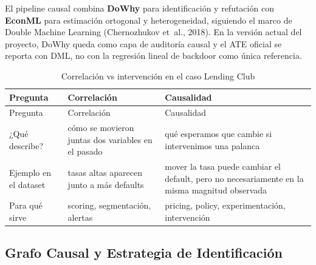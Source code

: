 \documentclass[
  spanish,
  11pt,
  letterpaper,
]{scrbook}
\theoremstyle{plain}
\theoremstyle{remark}
\begin{document}
El pipeline causal combina \textbf{DoWhy} para identificación y
refutación con \textbf{EconML} para estimación ortogonal y
heterogeneidad, siguiendo el marco de Double Machine Learning
({Chernozhukov et~al.}, 2018). En la versión actual del proyecto, DoWhy
queda como capa de auditoría causal y el ATE oficial se reporta con DML,
no con la regresión lineal de backdoor como única referencia.

\begin{longtable}[]{@{}
  >{\raggedright\arraybackslash}p{}
  >{\raggedright\arraybackslash}p{}
  >{\raggedright\arraybackslash}p{}@{}}
\caption{Correlación vs intervención en el caso Lending
Club}\label{tbl-correlation-vs-causality}\tabularnewline
\toprule\noalign{}
\begin{minipage}[b]{\linewidth}\raggedright
Pregunta
\end{minipage} & \begin{minipage}[b]{\linewidth}\raggedright
Correlación
\end{minipage} & \begin{minipage}[b]{\linewidth}\raggedright
Causalidad
\end{minipage} \\
\midrule\noalign{}
\endfirsthead
\toprule\noalign{}
\begin{minipage}[b]{\linewidth}\raggedright
Pregunta
\end{minipage} & \begin{minipage}[b]{\linewidth}\raggedright
Correlación
\end{minipage} & \begin{minipage}[b]{\linewidth}\raggedright
Causalidad
\end{minipage} \\
\midrule\noalign{}
\endhead
\bottomrule\noalign{}
\endlastfoot
¿Qué describe? & cómo se movieron juntas dos variables en el pasado &
qué esperamos que cambie si intervenimos una palanca \\
Ejemplo en el dataset & tasas altas aparecen junto a más defaults &
mover la tasa puede cambiar el default, pero no necesariamente en la
misma magnitud observada \\
Para qué sirve & scoring, segmentación, alertas & pricing, policy,
experimentación, intervención \\
\end{longtable}

\subsection{Grafo Causal y Estrategia de
Identificación}\label{grafo-causal-y-estrategia-de-identificaciuxf3n}
\end{document}
